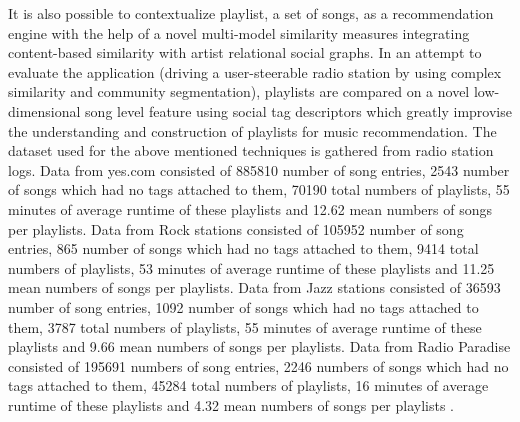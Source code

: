 \documentclass{proc}
\begin{document}
It is also possible to contextualize playlist, a set of songs, as a recommendation engine with the help of a novel multi-model similarity measures integrating content-based similarity with artist relational social graphs. In an attempt to evaluate the application (driving a user-steerable radio station by using complex similarity and community segmentation), playlists are compared on a novel low-dimensional song level feature using social tag descriptors which greatly improvise the understanding and construction of playlists for music recommendation. The dataset used for the above mentioned techniques is gathered from radio station logs. Data from yes.com consisted of 885810 number of song entries, 2543 number of songs which had no tags attached to them, 70190 total numbers of playlists, 55 minutes of average runtime of these playlists and 12.62 mean numbers of songs per playlists. Data from Rock stations consisted of 105952 number of song entries, 865 number of songs which had no tags attached to them, 9414 total numbers of playlists, 53 minutes of average runtime of these playlists and 11.25 mean numbers of songs per playlists. Data from Jazz stations consisted of 36593 number of song entries, 1092 number of songs which had no tags attached to them, 3787 total numbers of playlists, 55 minutes of average runtime of these playlists and 9.66 mean numbers of songs per playlists. Data from Radio Paradise consisted of 195691 numbers of song entries, 2246 numbers of songs which had no tags attached to them, 45284 total numbers of playlists, 16 minutes of average runtime of these playlists and 4.32 mean numbers of songs per playlists \cite{Fields2011a}. 
\end{document}
